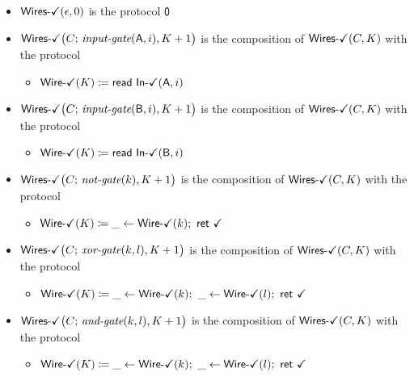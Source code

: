 \begin{itemize}
\item $\mathsf{Wires}\textsf{-}\checkmark(\epsilon,0)$ is the protocol $\mathsf{0}$
\item $\mathsf{Wires}\textsf{-}\checkmark\big(C; \, \textit{input-gate}(\mathsf{A},i),K+1\big)$ is the composition of $\mathsf{Wires}\textsf{-}\checkmark(C,K)$ with the protocol
\begin{itemize}
\item {\color{teal} $\mathsf{Wire}\textsf{-}\checkmark(K) \coloneqq \mathsf{read} \ \mathsf{In}\textsf{-}\checkmark(\mathsf{A},i)$}
\end{itemize}
\item $\mathsf{Wires}\textsf{-}\checkmark\big(C; \, \textit{input-gate}(\mathsf{B},i),K+1\big)$ is the composition of $\mathsf{Wires}\textsf{-}\checkmark(C,K)$ with the protocol
\begin{itemize}
\item {\color{teal} $\mathsf{Wire}\textsf{-}\checkmark(K) \coloneqq \mathsf{read} \ \mathsf{In}\textsf{-}\checkmark(\mathsf{B},i)$}
\end{itemize}
\item $\mathsf{Wires}\textsf{-}\checkmark\big(C; \, \textit{not-gate}(k),K+1\big)$ is the composition of $\mathsf{Wires}\textsf{-}\checkmark(C,K)$ with the protocol
\begin{itemize}
\item {\color{teal} $\mathsf{Wire}\textsf{-}\checkmark(K) \coloneqq \_ \leftarrow \mathsf{Wire}\textsf{-}\checkmark(k); \ \mathsf{ret} \ \checkmark$}
\end{itemize}
\item $\mathsf{Wires}\textsf{-}\checkmark\big(C; \, \textit{xor-gate}(k,l),K+1\big)$ is the composition of $\mathsf{Wires}\textsf{-}\checkmark(C,K)$ with the protocol
\begin{itemize}
\item {\color{teal} $\WireOk(K) \coloneqq \_ \leftarrow \WireOk(k); \ \_ \leftarrow \WireOk(l); \ \ret{\checkmark}$}
\end{itemize}
\item $\mathsf{Wires}\textsf{-}\checkmark\big(C; \, \textit{and-gate}(k,l),K+1\big)$ is the composition of $\mathsf{Wires}\textsf{-}\checkmark(C,K)$ with the protocol
\begin{itemize}
\item {\color{teal} $\WireOk(K) \coloneqq \_ \leftarrow \WireOk(k); \ \_ \leftarrow \WireOk(l); \ \ret{\checkmark}$}
\end{itemize}
\end{itemize}


